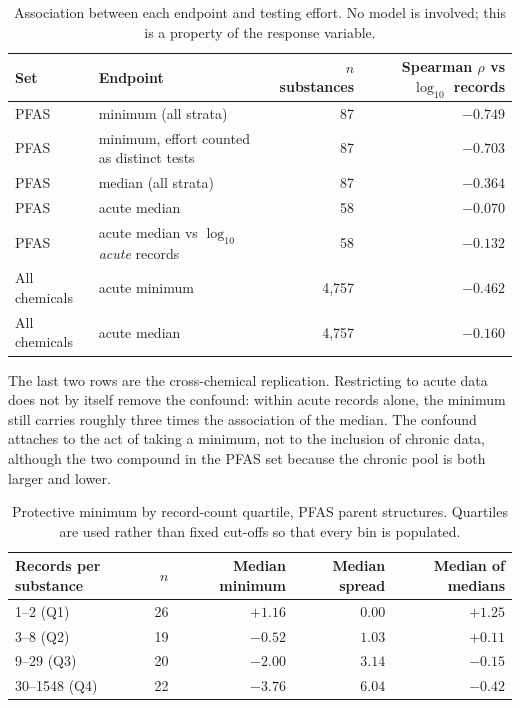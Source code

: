 \documentclass[11pt]{article}
\begin{document}
\begin{table}[h]
\centering
\caption{Association between each endpoint and testing effort. No model is
involved; this is a property of the response variable.}
\small
\begin{tabular}{llrr}
\toprule
Set & Endpoint & $n$ substances & Spearman $\rho$ vs $\log_{10}$ records \\
\midrule
PFAS & minimum (all strata) & 87 & $-0.749$ \\
PFAS & minimum, effort counted as distinct tests & 87 & $-0.703$ \\
PFAS & median (all strata)  & 87 & $-0.364$ \\
PFAS & acute median         & 58 & $-0.070$ \\
PFAS & acute median vs $\log_{10}$ \emph{acute} records & 58 & $-0.132$ \\
\midrule
All chemicals & acute minimum & 4{,}757 & $-0.462$ \\
All chemicals & acute median  & 4{,}757 & $-0.160$ \\
\bottomrule
\end{tabular}
\end{table}

The last two rows are the cross-chemical replication. Restricting to acute data
does not by itself remove the confound: within acute records alone, the minimum
still carries roughly three times the association of the median. The confound
attaches to the act of taking a minimum, not to the inclusion of chronic data,
although the two compound in the PFAS set because the chronic pool is both
larger and lower.

\begin{table}[h]
\centering
\caption{Protective minimum by record-count quartile, PFAS parent structures.
Quartiles are used rather than fixed cut-offs so that every bin is populated.}
\small
\begin{tabular}{lrrrr}
\toprule
Records per substance & $n$ & Median minimum & Median spread & Median of medians \\
\midrule
1--2 (Q1)      & 26 & $+1.16$ & $0.00$ & $+1.25$ \\
3--8 (Q2)      & 19 & $-0.52$ & $1.03$ & $+0.11$ \\
9--29 (Q3)     & 20 & $-2.00$ & $3.14$ & $-0.15$ \\
30--1548 (Q4)  & 22 & $-3.76$ & $6.04$ & $-0.42$ \\
\bottomrule
\end{tabular}
\end{table}
\end{document}
